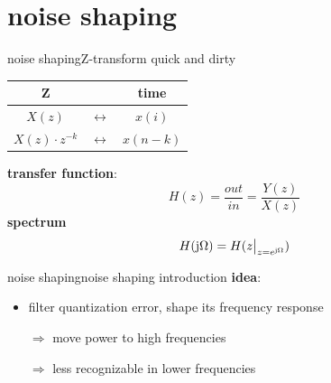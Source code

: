 \section{noise shaping}

	\begin{frame}{noise shaping}{Z-transform quick and dirty}
		\begin{table}
			\centering
					\begin{tabular}{ccc}
					\hline
					\textbf{Z} &  & \textbf{time}\\
					\hline 
					$X(z)$ &$\leftrightarrow$& $x(i)$\\
					$X(z)\cdot z^{-k}$ &$\leftrightarrow$& $x(n-k)$\\
					\end{tabular}
		\end{table}
		\pause
		\textbf{transfer function}:
		\begin{equation*}
			H(z) = \frac{out}{in} = \frac{Y(z)}{X(z)}
		\end{equation*}
		\pause
		\textbf{spectrum}
		\begin{equation*}
			H(\mathrm{j}\Omega) = H(z\big|_{z=e^{\mathrm{j}\Omega}})
		\end{equation*}
	\end{frame}
	
	\begin{frame}{noise shaping}{noise shaping introduction}
		\textbf{idea}:
		\begin{itemize}
			\item	filter quantization error, shape its frequency response
			\pause
            \bigskip
			\item[$\Rightarrow$]	move power to high frequencies
			\item[$\Rightarrow$]	less recognizable in lower frequencies
		\end{itemize}
	\end{frame}
	
